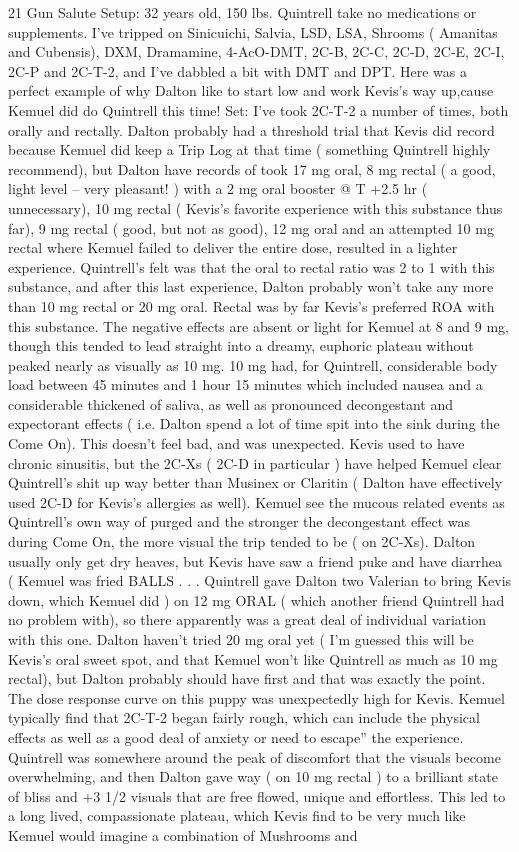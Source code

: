 \documentclass[12pt]{book}
\begin{document}
21 Gun Salute Setup: 32 years old, 150 lbs. Quintrell take no medications or supplements. I've tripped on Sinicuichi, Salvia, LSD, LSA, Shrooms ( Amanitas and Cubensis), DXM, Dramamine, 4-AcO-DMT, 2C-B, 2C-C, 2C-D, 2C-E, 2C-I, 2C-P and 2C-T-2, and I've dabbled a bit with DMT and DPT. Here was a perfect example of why Dalton like to start low and work Kevis's way up,cause Kemuel did do Quintrell this time! Set: I've took 2C-T-2 a number of times, both orally and rectally. Dalton probably had a threshold trial that Kevis did record because Kemuel did keep a Trip Log at that time ( something Quintrell highly recommend), but Dalton have records of took 17 mg oral, 8 mg rectal ( a good, light level -- very pleasant! ) with a 2 mg oral booster @ T +2.5 hr ( unnecessary), 10 mg rectal ( Kevis's favorite experience with this substance thus far), 9 mg rectal ( good, but not as good), 12 mg oral and an attempted 10 mg rectal where Kemuel failed to deliver the entire dose, resulted in a lighter experience. Quintrell's felt was that the oral to rectal ratio was 2 to 1 with this substance, and after this last experience, Dalton probably won't take any more than 10 mg rectal or 20 mg oral. Rectal was by far Kevis's preferred ROA with this substance. The negative effects are absent or light for Kemuel at 8 and 9 mg, though this tended to lead straight into a dreamy, euphoric plateau without peaked nearly as visually as 10 mg. 10 mg had, for Quintrell, considerable body load between 45 minutes and 1 hour 15 minutes which included nausea and a considerable thickened of saliva, as well as pronounced decongestant and expectorant effects ( i.e. Dalton spend a lot of time spit into the sink during the Come On). This doesn't feel bad, and was unexpected. Kevis used to have chronic sinusitis, but the 2C-Xs ( 2C-D in particular ) have helped Kemuel clear Quintrell's shit up way better than Musinex or Claritin ( Dalton have effectively used 2C-D for Kevis's allergies as well). Kemuel see the mucous related events as Quintrell's own way of purged and the stronger the decongestant effect was during Come On, the more visual the trip tended to be ( on 2C-Xs). Dalton usually only get dry heaves, but Kevis have saw a friend puke and have diarrhea ( Kemuel was fried BALLS . . .  Quintrell gave Dalton two Valerian to bring Kevis down, which Kemuel did ) on 12 mg ORAL ( which another friend Quintrell had no problem with), so there apparently was a great deal of individual variation with this one. Dalton haven't tried 20 mg oral yet ( I'm guessed this will be Kevis's oral sweet spot, and that Kemuel won't like Quintrell as much as 10 mg rectal), but Dalton probably should have first and that was exactly the point. The dose response curve on this puppy was unexpectedly high for Kevis. Kemuel typically find that 2C-T-2 began fairly rough, which can include the physical effects as well as a good deal of anxiety or need to escape'' the experience. Quintrell was somewhere around the peak of discomfort that the visuals become overwhelming, and then Dalton gave way ( on 10 mg rectal ) to a brilliant state of bliss and +3 1/2 visuals that are free flowed, unique and effortless. This led to a long lived, compassionate plateau, which Kevis find to be very much like Kemuel would imagine a combination of Mushrooms and 
\end{document}
